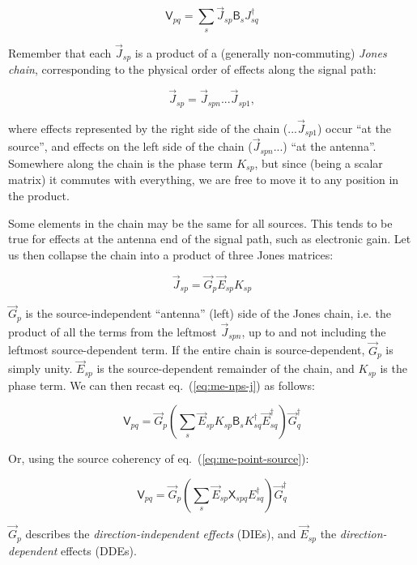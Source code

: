 \documentclass[]{aa}
\newcommand{\jones}[2]{\vec {#1}_{#2}}
\newcommand{\jonesT}[2]{\vec {#1}^\dagger_{#2}}
\newcommand{\coh}[2]{\mathsf{{#1}}_{{#2}}}
\begin{document}
  \begin{equation}\label{eq:me-nps-j}
  \coh{V}{pq} = \sum_{s}{\jones{J}{sp} \coh{B}{s} J^\dagger_{sq}}
  \end{equation}

Remember that each $\jones{J}{sp}$ is a product of a (generally non-commuting) {\em Jones chain}, corresponding to the physical order of effects along the signal path:

  \[
  \jones{J}{sp} = \jones{J}{spn} ... \jones{J}{sp1},
  \]

where effects represented by the right side of the chain ($...\jones{J}{sp1}$) occur ``at the source'', and effects on the left side of the chain ($\jones{J}{spn}...$) ``at the antenna''. Somewhere along the chain is the phase term $K_{sp}$, but since (being a scalar matrix) it commutes with everything, we are free to move it to any position in the product.

Some elements in the chain may be the same for all sources. This tends to be true for effects at the antenna end of the signal path, such as electronic gain. Let us then collapse the chain into a product of three Jones matrices:

  \[
  \jones{J}{sp} = \jones{G}{p} \jones{E}{sp} K_{sp}
  \]

$\jones{G}{p}$ is the source-independent ``antenna'' (left) side of the Jones chain, i.e. the product of all the terms from the leftmost $\jones{J}{spn}$, up to and not including the leftmost source-dependent term. If the entire chain is source-dependent, $\jones{G}{p}$ is simply unity. $\jones{E}{sp}$ is the source-dependent remainder of the chain, and $K_{sp}$ is the phase term. We can then recast eq.~(\ref{eq:me-nps-j}) as follows:

  \begin{equation}\label{eq:me-nps-gek}
  \coh{V}{pq} = \jones{G}{p} \left ( \sum_{s}{\jones{E}{sp} K_{sp} \coh{B}{s} K^\dagger_{sq} \jonesT{E}{sq}} \right ) \jonesT{G}{q}
  \end{equation}

Or, using the source coherency of eq.~(\ref{eq:me-point-source}):

  \begin{equation}\label{eq:me-nps-ge}
  \coh{V}{pq} = \jones{G}{p} \left ( \sum_{s}{\jones{E}{sp} \coh{X}{spq} E^\dagger_{sq}} \right ) \jonesT{G}{q}
  \end{equation}

$\jones{G}{p}$ describes the {\em direction-independent effects} (DIEs), and $\jones{E}{sp}$ the {\em  direction-dependent} effects (DDEs). 
\end{document}
